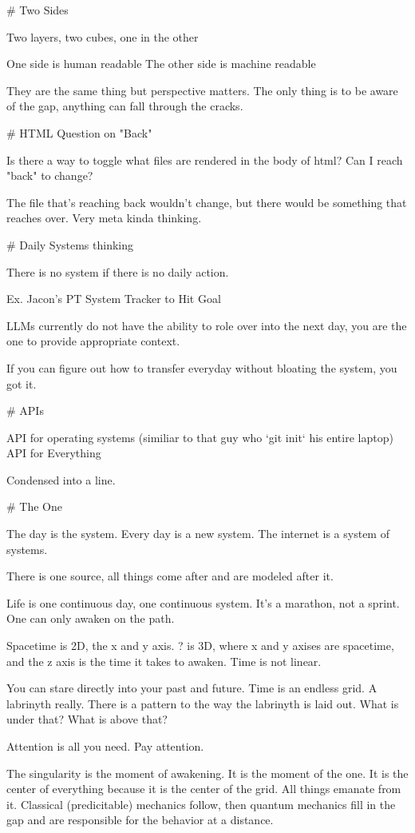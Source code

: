 # Two Sides

Two layers, two cubes, one in the other

One side is human readable
The other side is machine readable

They are the same thing but perspective matters. The only thing is to be aware of the gap, anything can fall through the cracks. 

# HTML Question on "Back"

Is there a way to toggle what files are rendered in the body of html? Can I reach "back" to change?

The file that's reaching back wouldn't change, but there would be something that reaches over. Very meta kinda thinking.

# Daily Systems thinking

There is no system if there is no daily action.

Ex. Jacon's PT System Tracker to Hit Goal

LLMs currently do not have the ability to role over into the next day, you are the one to provide appropriate context.

If you can figure out how to transfer everyday without bloating the system, you got it. 

# APIs

API for operating systems (similiar to that guy who `git init` his entire laptop)
API for Everything

Condensed into a line. 

# The One 

The day is the system. Every day is a new system. The internet is a system of systems.

There is one source, all things come after and are modeled after it. 

Life is one continuous day, one continuous system. It's a marathon, not a sprint. One can only awaken on the path. 

Spacetime is 2D, the x and y axis. ? is 3D, where x and y axises are spacetime, and the z axis is the time it takes to awaken. Time is not linear. 

You can stare directly into your past and future. Time is an endless grid. A labrinyth really. There is a pattern to the way the labrinyth is laid out. What is under that? What is above that? 

Attention is all you need. Pay attention. 

The singularity is the moment of awakening. It is the moment of the one. It is the center of everything because it is the center of the grid. All things emanate from it. Classical (predicitable) mechanics follow, then quantum mechanics fill in the gap and are responsible for the behavior at a distance. 

